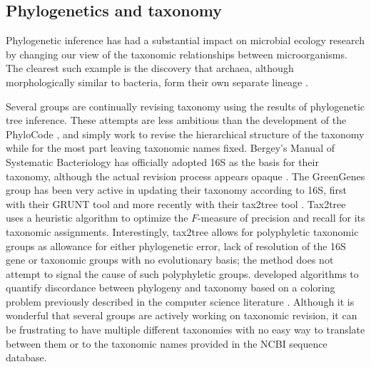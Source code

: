 \documentclass{amsart}
\begin{document}
\subsection{Phylogenetics and taxonomy}

Phylogenetic inference has had a substantial impact on microbial ecology research by changing our view of the taxonomic relationships between microorganisms.
The clearest such example is the discovery that archaea, although morphologically similar to bacteria, form their own separate lineage \citep{woese1977phylogenetic}.

Several groups are continually revising taxonomy using the results of phylogenetic tree inference.
These attempts are less ambitious than the development of the PhyloCode \citep{forey2001phylocode}, and simply work to revise the hierarchical structure of the taxonomy while for the most part leaving taxonomic names fixed.
Bergey's Manual of Systematic Bacteriology has officially adopted 16S as the basis for their taxonomy, although the actual revision process appears opaque \citep{kreig1984bergey}.
The GreenGenes group \citep{desantis2006greengenes} has been very active in updating their taxonomy according to 16S, first with their GRUNT tool \citep{dalevi2007automated} and more recently with their tax2tree tool \citep{mcdonald2011improved}.
Tax2tree uses a heuristic algorithm to optimize the $F$-measure of precision and recall for its taxonomic assignments.
Interestingly, tax2tree allows for polyphyletic taxonomic groups as allowance for either phylogenetic error, lack of resolution of the 16S gene or taxonomic groups with no evolutionary basis; the method does not attempt to signal the cause of such polyphyletic groups.
\citet{matsen2012reconciling} developed algorithms to quantify discordance between phylogeny and taxonomy based on a coloring problem previously described in the computer science literature \citep{moran2008convex}.
Although it is wonderful that several groups are actively working on taxonomic revision, it can be frustrating to have multiple different taxonomies with no easy way to translate between them or to the taxonomic names provided in the NCBI sequence database.
\end{document}
